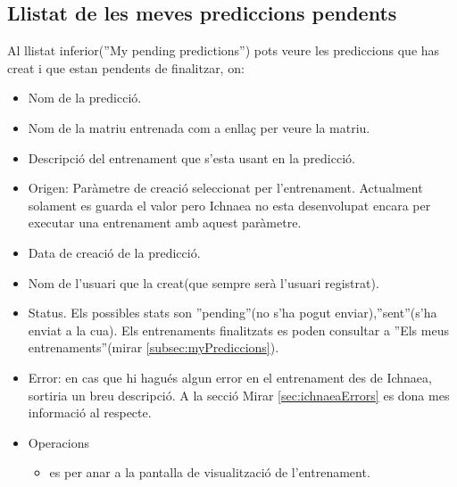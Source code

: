 \subsection{Llistat de les meves prediccions pendents}
Al llistat inferior(''My pending predictions'') pots veure les prediccions que has creat i que estan pendents de finalitzar, on: 
\begin{itemize}
\item Nom de la predicció.
\item Nom de la matriu entrenada com a enllaç per veure la matriu.
\item Descripci\'{o} del entrenament que s'esta usant en la predicció.
\item Origen: Paràmetre de creació seleccionat per l'entrenament. Actualment solament es guarda el valor pero Ichnaea no esta desenvolupat encara per executar una entrenament amb aquest paràmetre.
\item Data de creaci\'{o} de la predicció.
\item Nom de l'usuari que la creat(que sempre serà l'usuari registrat).
\item Status. Els possibles stats son ''pending''(no s'ha pogut enviar),''sent''(s'ha enviat a la cua). Els entrenaments finalitzats es poden consultar a ''Els meus entrenaments''(mirar \ref{subsec:myPrediccions}).
\item Error: en cas que hi hagués algun error en el entrenament des de Ichnaea, sortiria un breu descripció. A la secció Mirar \ref{sec:ichnaeaErrors} es dona mes informació al respecte.
\item Operacions
 \begin{itemize}
 \item \iconeyeopen es per anar a la pantalla de visualització de l'entrenament.
 \end{itemize}
\end{itemize}

